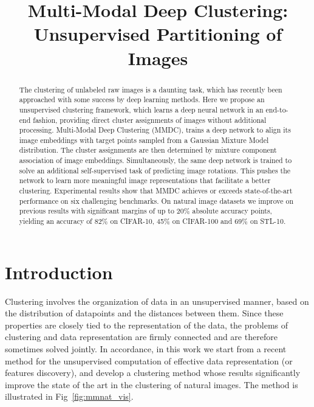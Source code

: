 \documentclass[a4paper,conference]{IEEEtran}
\begin{document}
\title{Multi-Modal Deep Clustering: Unsupervised Partitioning of Images}

\author{
\and
{}
}

\maketitle
\thispagestyle{firstpage}

\begin{abstract}
   The clustering of unlabeled raw images is a daunting task, which has recently been approached with some success by deep learning methods. Here we propose an unsupervised clustering framework, which learns a deep neural network in an end-to-end fashion, providing direct cluster assignments of images without additional processing. Multi-Modal Deep Clustering (MMDC), trains a deep network to align its image embeddings with target points sampled from a Gaussian Mixture Model distribution. The cluster assignments are then determined by mixture component association of image embeddings. Simultaneously, the same deep network is trained to solve an additional self-supervised task of predicting image rotations. This pushes the network to learn more meaningful image representations that facilitate a better clustering. Experimental results show that MMDC achieves or exceeds state-of-the-art performance on six challenging benchmarks. On natural image datasets we improve on previous results with significant margins of up to 20\% absolute accuracy points, yielding an accuracy of 82\% on CIFAR-10, 45\% on CIFAR-100 and 69\% on STL-10.
\end{abstract}


\section{Introduction}
Clustering involves the organization of data in an unsupervised manner, based on the distribution of datapoints and the distances between them. Since these properties are closely tied to the representation of the data, the problems of clustering and data representation are firmly connected and are therefore sometimes solved jointly. In accordance, in this work we start from a recent method for the unsupervised computation of effective data representation (or features discovery), and develop a clustering method whose results significantly improve the state of the art in the clustering of natural images. The method is illustrated in Fig~\ref{fig:mmnat_vis}. 
\end{document}

